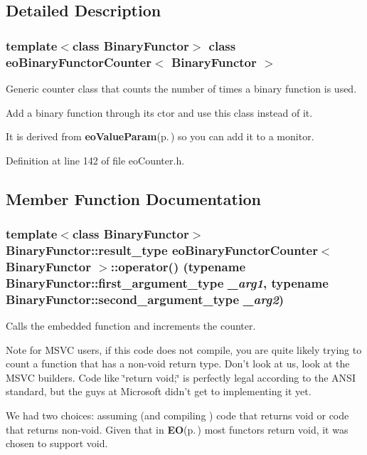 \subsection{Detailed Description}
\subsubsection*{template$<$class Binary\-Functor$>$ class eo\-Binary\-Functor\-Counter$<$ Binary\-Functor $>$}

Generic counter class that counts the number of times a binary function is used. 

Add a binary function through its ctor and use this class instead of it.

It is derived from {\bf eo\-Value\-Param}{\rm (p.\,\pageref{classeo_value_param})} so you can add it to a monitor. 



Definition at line 142 of file eo\-Counter.h.

\subsection{Member Function Documentation}
\subsubsection{\setlength{\rightskip}{0pt plus 5cm}template$<$class Binary\-Functor$>$ Binary\-Functor::result\_\-type {\bf eo\-Binary\-Functor\-Counter}$<$ Binary\-Functor $>$::operator() (typename Binary\-Functor::first\_\-argument\_\-type {\em \_\-arg1}, typename Binary\-Functor::second\_\-argument\_\-type {\em \_\-arg2})\hspace{0.3cm}{\tt  [inline]}}\label{classeo_binary_functor_counter_a1}


Calls the embedded function and increments the counter. 

Note for MSVC users, if this code does not compile, you are quite likely trying to count a function that has a non-void return type. Don't look at us, look at the MSVC builders. Code like \char`\"{}return void;\char`\"{} is perfectly legal according to the ANSI standard, but the guys at Microsoft didn't get to implementing it yet.

We had two choices: assuming (and compiling ) code that returns void or code that returns non-void. Given that in {\bf EO}{\rm (p.\,\pageref{class_e_o})} most functors return void, it was chosen to support void.

